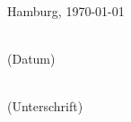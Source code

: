 \vspace{1cm}
Hamburg, \today\\[-1ex]
\mbox{}\hspace{2.2cm}\parbox[t]{4cm}{\centering \dotfill\\(Datum)}\hspace{0.5cm}
					\parbox[t]{8cm}{\centering \dotfill\\(Unterschrift)}
					
\cleardoublepage
\listoffigures
\listoftables
\lstlistoflistings



 


\cleardoublepage
\tableofcontents


%

\newpage


